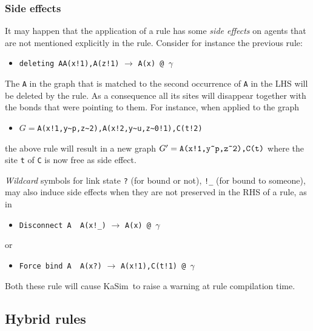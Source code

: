 \documentclass[11pt]{book}
\def\KaSim{\textsf{KaSim}}
\def\int{\hbox{\texttt{\~}}}
\def\ttt#1{\texttt{#1}}
\def\rar{\rightarrow}
\def\ga{\gamma}
\def\ITE#1{\begin{itemize}#1\end{itemize}}
\begin{document}
\subsubsection*{Side effects}\label{sec:side-effect}

It may happen that the application of a rule has some \emph{side effects} on agents that are not mentioned explicitly in the rule. Consider for instance the previous rule:
\ITE{
\item[] \ttt{\textquotesingle deleting A\textquotesingle  A(x!1),A(z!1)} $\rar$ \ttt{A(x) @ $\ga$} 
}
The \ttt{A} in the graph that is matched to the second occurrence of \ttt{A} in the LHS will be deleted by the rule. As a consequence all its sites will disappear together with the bonds that were pointing to them. For instance, when applied to the graph 
\ITE{
\item[] $G=$\ttt{A(x!1,y\int p,z\int2),A(x!2,y\int u,z\int0!1),C(t!2)}
} 
the above rule will result in a new graph $G' =\ttt{A(x!1,y\int p,z\int2),C(t)}$ where the site \ttt{t} of \ttt{C} is now free as side effect.

\emph{Wildcard} symbols for link state \ttt{?} (for bound or not), \ttt{!\_} (for bound to someone), may also induce side effects when they are not preserved in the RHS of a rule, as in
\ITE{
\item[] \ttt{\textquotesingle Disconnect A\textquotesingle ~ A(x!\_)} $\rar$ \ttt{A(x) @ $\ga$} 
}
or 
\ITE{
\item[] \ttt{\textquotesingle Force bind A\textquotesingle  ~ A(x?)} $\rar$ \ttt{A(x!1),C(t!1) @ $\ga$} 
}
Both these rule will cause \KaSim~to raise a warning at rule compilation time.

\subsection{Hybrid rules}\label{sec:hybrid}
\end{document}
